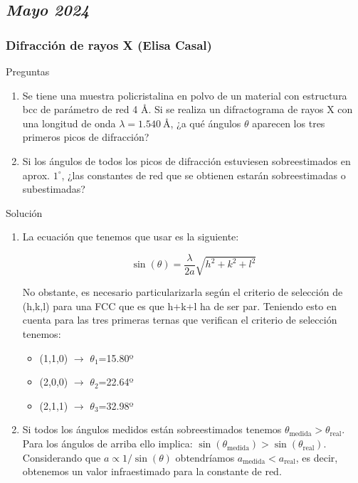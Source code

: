 \subsection*{\textit{Mayo 2024}}\begin{Enunciado}

	\subsubsection{Difracción de rayos X (Elisa Casal)}
	Preguntas
	\begin{enumerate}[label=\alph*)]
		\item Se tiene una muestra policristalina en polvo de un material con estructura bcc de parámetro de red 4 Å. Si se realiza un difractograma de rayos X con una longitud de onda \( \lambda = 1.540\ \text{\AA} \), ¿a qué ángulos \( \theta \) aparecen los tres primeros picos de difracción?
		\item Si los ángulos de todos los picos de difracción estuviesen sobreestimados en aprox. \( 1^\circ \), ¿las constantes de red que se obtienen estarán sobreestimadas o subestimadas?
	\end{enumerate}
\end{Enunciado}


Solución
\begin{enumerate}[label=\alph*)]
	\item La ecuación que tenemos que usar es la siguiente:

	      \begin{equation}
		      \sin (\theta)=\frac{\lambda}{2a}\sqrt{h^2+k^2+l^2}
	      \end{equation}

	      No obstante, es necesario particularizarla según el criterio de selección de (h,k,l) para una FCC que es que h+k+l ha de ser par. Teniendo esto en cuenta para las tres primeras ternas que verifican el criterio de selección tenemos:

	      \begin{itemize}
		      \item (1,1,0) $\longrightarrow$ $\theta_1$=15.80º
		      \item (2,0,0) $\longrightarrow$ $\theta_2$=22.64º
		      \item (2,1,1) $\longrightarrow$ $\theta_3$=32.98º
	      \end{itemize}

	\item Si todos los ángulos medidos están sobreestimados tenemos $\theta_{\text{medida}}>\theta_{\text{real}}$. Para los ángulos de arriba ello implica: $\sin(\theta_{\text{medida}})>\sin(\theta_{\text{real}})$. Considerando que $a \propto 1/\sin(\theta)$ obtendríamos $a_{\text{medida}}<a_{\text{real}}$, es decir, obtenemos un valor infraestimado para la constante de red.
\end{enumerate}

